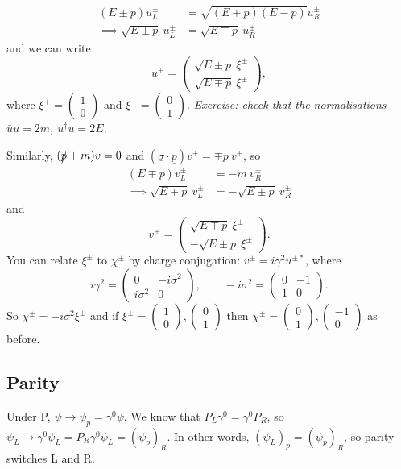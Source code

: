 \documentclass[a4paper,12pt]{article}
\newcommand{\icol}[1]{%
  \left(\begin{smallmatrix}#1\end{smallmatrix}\right)%
}
\begin{document}
\begin{equation}
\begin{split}
(E \pm p)u_L^\pm &= \sqrt{(E+p)(E-p)}u_R^\pm \\
\implies \sqrt{E\pm p}\ u_L^\pm &= \sqrt{E \mp p}\ u_R^\pm 
\end{split}
\end{equation}
and we can write
%
\[ u^\pm =
\left( \begin{array}{c}
\sqrt{E \pm p} \ \xi^\pm   \\
\sqrt{E \mp p} \ \xi^\pm  \end{array} \right), \] 
%
where $\xi^+ = \icol{1\\0}$ and $\xi^- = \icol{0\\1}$. 
\newline
\newline
\textit{Exercise: check that the normalisations $\bar{u}u = 2m$, $u^\dagger u = 2E$.}
\newline

Similarly, $(\slashed{p} +m)v = 0$ and $(\underline{\sigma}\cdot\underline{p})v^\pm = \mp p\ v^\pm$, so 
\begin{equation}
\begin{split}
(E \mp p)v_L^\pm &= -m\ v_R^\pm \\
\implies \sqrt{E\mp p}\ v_L^\pm &= -\sqrt{E \pm p}\ v_R^\pm 
\end{split}
\end{equation}
and
%
\[ v^\pm =
\left( \begin{array}{c}
\sqrt{E \mp p} \ \xi^\pm   \\
-\sqrt{E \pm p} \ \xi^\pm  \end{array} \right). \] 
%
You can relate $\xi^\pm$ to $\chi^\pm$ by charge conjugation: $v^\pm = i \gamma^2 u^{\pm *}$, where
%
\[ i\gamma^2 = \left( \begin{array}{cc}
0 & -i \sigma^2  \\
i\sigma^2 & 0  \end{array} \right), \qquad 
-i\sigma^2 = \left( \begin{array}{cc}
0 & -1 \\
1 & 0 \end{array} \right). \]
%
So $\chi^\pm = -i\sigma^2\xi^\pm$ and if $\xi^\pm = \icol{1\\0}, \icol{0\\1}$ then $\chi^\pm = \icol{0\\1}, \icol{-1\\0}$ as before.
%
\subsection{Parity}
%
Under P, $\psi \to \psi_p = \gamma^0\psi$. We know that $P_L \gamma^0 = \gamma^0 P_R$, so $\psi_L \to \gamma^0 \psi_L =  P_R\gamma^0 \psi_L = (\psi_p)_R$. In other words, $(\psi_L)_p = (\psi_p)_R$, so parity switches L and R.
\end{document}
